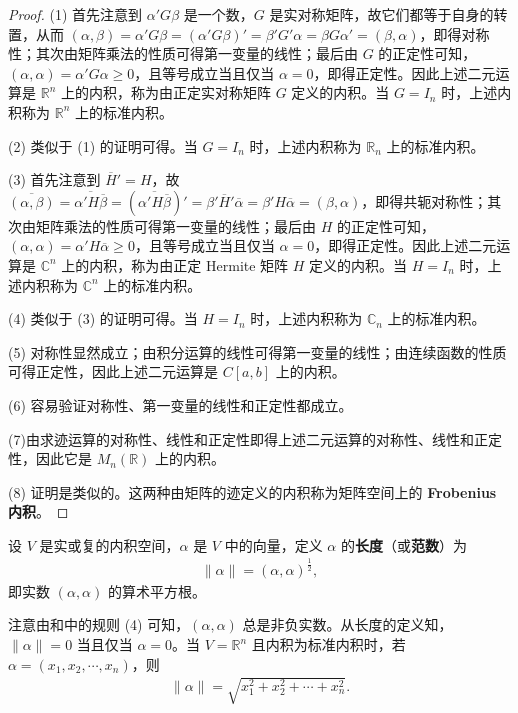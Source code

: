 \documentclass[../../main.tex]{subfiles}
\begin{document}
\begin{proof}
(1) 首先注意到 $\alpha'G\beta$ 是一个数，$G$ 是实对称矩阵，故它们都等于自身的转置，从而 $(\alpha, \beta) = \alpha'G\beta = (\alpha'G\beta)' = \beta'G'\alpha = \beta G\alpha' = (\beta, \alpha)$，即得对称性；其次由矩阵乘法的性质可得第一变量的线性；最后由 $G$ 的正定性可知，$(\alpha, \alpha) = \alpha'G\alpha \geq 0$，且等号成立当且仅当 $\alpha = 0$，即得正定性。因此上述二元运算是 $\mathbb{R}^n$ 上的内积，称为由正定实对称矩阵 $G$ 定义的内积。当 $G = I_n$ 时，上述内积称为 $\mathbb{R}^n$ 上的标准内积。

(2) 类似于 (1) 的证明可得。当 $G = I_n$ 时，上述内积称为 $\mathbb{R}_n$ 上的标准内积。

(3) 首先注意到 $\overline{H}' = H$，故 $\overline{(\alpha, \beta)} = \overline{\alpha' H\overline{\beta}} = (\overline{\alpha' H\overline{\beta}})' = \beta'\overline{H}'\overline{\alpha} = \beta' H\overline{\alpha} = (\beta, \alpha)$，即得共轭对称性；其次由矩阵乘法的性质可得第一变量的线性；最后由 $H$ 的正定性可知，$(\alpha, \alpha) = \alpha' H\overline{\alpha} \geq 0$，且等号成立当且仅当 $\alpha = 0$，即得正定性。因此上述二元运算是 $\mathbb{C}^n$ 上的内积，称为由正定 Hermite 矩阵 $H$ 定义的内积。当 $H = I_n$ 时，上述内积称为 $\mathbb{C}^n$ 上的标准内积。

(4) 类似于 (3) 的证明可得。当 $H = I_n$ 时，上述内积称为 $\mathbb{C}_n$ 上的标准内积。

(5) 对称性显然成立；由积分运算的线性可得第一变量的线性；由连续函数的性质可得正定性，因此上述二元运算是 $C[a, b]$ 上的内积。

(6) 容易验证对称性、第一变量的线性和正定性都成立。

(7)由求迹运算的对称性、线性和正定性即得上述二元运算的对称性、线性和正定性，因此它是 $M_n(\mathbb{R})$ 上的内积。

(8) 证明是类似的。这两种由矩阵的迹定义的内积称为矩阵空间上的 \hypertarget{Frobenius 内积}{\textbf{Frobenius 内积}}。
\end{proof}

\begin{definition}[范数]\label{definition:向量的长度或范数}
设 \(V\) 是实或复的内积空间，\(\alpha\) 是 \(V\) 中的向量，定义 \(\alpha\) 的\textbf{长度}（或\textbf{范数}）为
\begin{align*}
\|\alpha\|=(\alpha,\alpha)^{\frac{1}{2}},
\end{align*}
即实数 \((\alpha,\alpha)\) 的算术平方根。
\end{definition}
\begin{remark}
注意由和中的规则 (4) 可知，\((\alpha,\alpha)\) 总是非负实数。从长度的定义知，\(\|\alpha\| = 0\) 当且仅当 \(\alpha = 0\)。当 \(V=\mathbb{R}^n\) 且内积为标准内积时，若 \(\alpha=(x_1,x_2,\cdots,x_n)\)，则
\begin{align*}
\|\alpha\|=\sqrt{x_1^2 + x_2^2+\cdots + x_n^2}.
\end{align*}
\end{remark}
\end{document}
